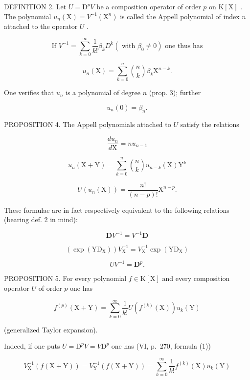 DEFINITION 2. Let \(U = \mathrm{D}^p V\) be a composition operator of order \(p\) on \(\mathrm{K}[\mathrm{X}]\) . The polynomial \(u_n(\mathrm{X}) = V^{-1}(\mathrm{X}^n)\) is called the Appell polynomial of index \(n\) attached to the operator \(U\) .

\[
\text {   If   } V ^ {- 1} = \sum_ {k = 0} ^ {\infty} \frac {1}{k !} \beta_ {k} D ^ {k} (\text {   with   } \beta_ {0} \neq 0) \text {   one   thus   has   }
\]

\[
u _ {n} (\mathrm{X}) = \sum_ {k = 0} ^ {n} {\binom {n} {k}} \beta_ {k}   \mathrm{X} ^ {n - k}.\tag{6}
\]

One verifies that \(u_{n}\) is a polynomial of degree \(n\) (prop. 3); further

\[
u _ {n} (0) = \beta_ {n}.
\]

PROPOSITION 4. The Appell polynomials attached to \(U\) satisfy the relations

\[
\frac {d u _ {n}}{d \mathrm{X}} = n u _ {n - 1}\tag{7}
\]

\[
u _ {n} (\mathrm{X} + \mathrm{Y}) = \sum_ {k = 0} ^ {n} {\binom {n} {k}} u _ {n - k} (\mathrm{X})   \mathrm{Y} ^ {k}\tag{8}
\]

\[
U \left(u _ {n} (\mathrm{X})\right) = \frac {n !}{(n - p) !} \mathrm{X} ^ {n - p}.\tag{9}
\]

These formulae are in fact respectively equivalent to the following relations (bearing def. 2 in mind):

\[
\mathbf {D} V ^ {- 1} = V ^ {- 1} \mathbf {D}\tag{10}
\]

\[
\left(\exp \left(\mathrm{YD} _ {\mathrm{X}}\right)\right) V _ {\mathrm{X}} ^ {- 1} = V _ {\mathrm{X}} ^ {- 1} \exp \left(\mathrm{YD} _ {\mathrm{X}}\right)\tag{11}
\]

\[
U V ^ {- 1} = \mathbf {D} ^ {p}.\tag{12}
\]

PROPOSITION 5. For every polynomial \(f \in \mathrm{K}[\mathrm{X}]\) and every composition operator \(U\) of order \(p\) one has

\[
f ^ {(p)} (\mathrm{X} + \mathrm{Y}) = \sum_ {k = 0} ^ {\infty} \frac {1}{k !} U (f ^ {(k)} (\mathrm{X})) u _ {k} (\mathrm{Y})\tag{13}
\]

(generalized Taylor expansion).

Indeed, if one puts \(U = \mathrm{D}^p V = V\mathrm{D}^p\) one has (VI, p.~270, formula (1))

\[
V _ {\mathrm{X}} ^ {- 1} (f (\mathrm{X} + \mathrm{Y})) = V _ {\mathrm{Y}} ^ {- 1} (f (\mathrm{X} + \mathrm{Y})) = \sum_ {k = 0} ^ {\infty} \frac {1}{k !} f ^ {(k)} (\mathrm{X}) u _ {k} (\mathrm{Y})\tag{14}
\]


